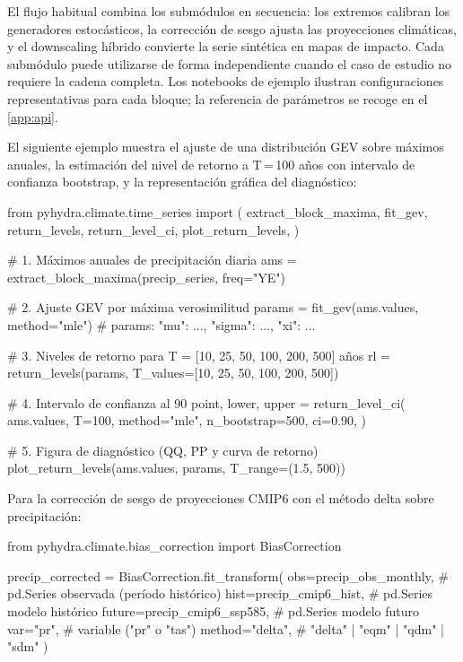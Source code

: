 El flujo habitual combina los submódulos en secuencia: los extremos calibran los generadores estocásticos, la corrección de sesgo ajusta las proyecciones climáticas, y el downscaling híbrido convierte la serie sintética en mapas de impacto. Cada submódulo puede utilizarse de forma independiente cuando el caso de estudio no requiere la cadena completa. Los notebooks de ejemplo ilustran configuraciones representativas para cada bloque; la referencia de parámetros se recoge en el \cref{app:api}.

El siguiente ejemplo muestra el ajuste de una distribución GEV sobre máximos anuales, la estimación del nivel de retorno a T\,=\,100 años con intervalo de confianza bootstrap, y la representación gráfica del diagnóstico:

\begin{codeblock}
from pyhydra.climate.time_series import (
    extract_block_maxima, fit_gev, return_levels, return_level_ci,
    plot_return_levels,
)

# 1. Máximos anuales de precipitación diaria
ams = extract_block_maxima(precip_series, freq="YE")

# 2. Ajuste GEV por máxima verosimilitud
params = fit_gev(ams.values, method="mle")
# params: {"mu": ..., "sigma": ..., "xi": ...}

# 3. Niveles de retorno para T = [10, 25, 50, 100, 200, 500] años
rl = return_levels(params, T_values=[10, 25, 50, 100, 200, 500])

# 4. Intervalo de confianza al 90%
point, lower, upper = return_level_ci(
    ams.values, T=100, method="mle",
    n_bootstrap=500, ci=0.90,
)

# 5. Figura de diagnóstico (QQ, PP y curva de retorno)
plot_return_levels(ams.values, params, T_range=(1.5, 500))
\end{codeblock}

Para la corrección de sesgo de proyecciones CMIP6 con el método delta sobre precipitación:

{\footnotesize
\begin{codeblock}
from pyhydra.climate.bias_correction import BiasCorrection

precip_corrected = BiasCorrection.fit_transform(
    obs=precip_obs_monthly,        # pd.Series observada (período histórico)
    hist=precip_cmip6_hist,        # pd.Series modelo histórico
    future=precip_cmip6_ssp585,    # pd.Series modelo futuro
    var="pr",                      # variable ("pr" o "tas")
    method="delta",                # "delta" | "eqm" | "qdm" | "sdm"
)
\end{codeblock}
}

